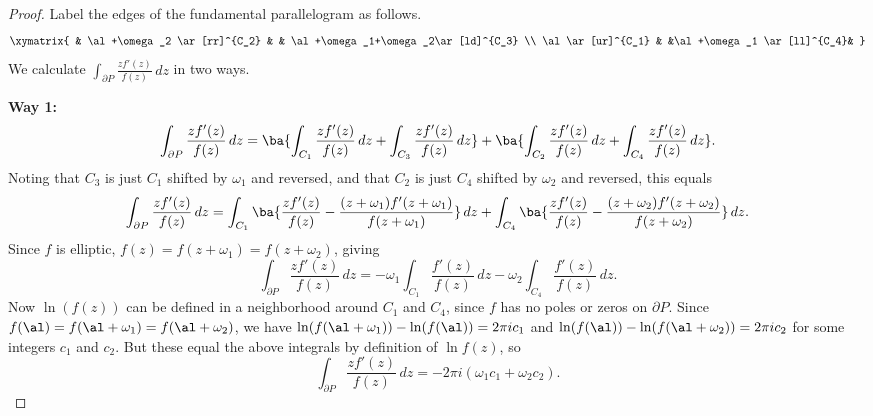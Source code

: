 \begin{proof}
Label the edges of the fundamental parallelogram as follows.
\[
\xymatrix{
& \al+\omega_2 \ar[rr]^{C_2} & & \al+\omega_1+\omega_2\ar[ld]^{C_3} \\
\al\ar[ur]^{C_1} & &\al+\omega_1 \ar[ll]^{C_4}&
}
\]
We calculate $\int_{\partial P} \frac{zf'(z)}{f(z)}\,dz$ in two ways.

\textbf{Way 1:} 
\[
\int_{\partial P} \frac{zf'(z)}{f(z)} \,dz=\ba{
\int_{C_1} \frac{zf'(z)}{f(z)}\,dz
+\int_{C_3} \frac{zf'(z)}{f(z)}\,dz
}
+\ba{
\int_{C_2} \frac{zf'(z)}{f(z)}\,dz
+\int_{C_4} \frac{zf'(z)}{f(z)}\,dz
}.
\]
Noting that $C_3$ is just $C_1$ shifted by $\omega_1$ and reversed, and that $C_2$ is just $C_4$ shifted by $\omega_2$ and reversed, this equals
\[
\int_{\partial P} \frac{zf'(z)}{f(z)} \,dz=
\int_{C_1} \ba{\frac{zf'(z)}{f(z)}
-\frac{(z+\omega_1)f'(z+\omega_1)}{f(z+\omega_1 )}
}\,dz
+
\int_{C_4} \ba{\frac{zf'(z)}{f(z)}- \frac{(z+\omega_2)f'(z+\omega_2)}{f(z+\omega_2)}
}\,dz.
\]
Since $f$ is elliptic, $f(z)=f(z+\omega_1)=f(z+\omega_2)$, giving
\[
\int_{\partial P} \frac{zf'(z)}{f(z)} \,dz=
-\omega_1\int_{C_1} \frac{f'(z)}{f(z)} \,dz-\omega_2\int_{C_4} \frac{f'(z)}{f(z)}\,dz.
\]
Now $\ln(f(z))$ can be defined in a neighborhood around $C_1$ and $C_4$, since $f$ has no poles or zeros on $\partial P$. Since $f(\al)=f(\al+\omega_1)=f(\al+\omega_2)$, we have $\ln(f(\al+\omega_1))-\ln(f(\al))=2\pi i c_1$ and $\ln(f(\al))-\ln(f(\al+\omega_2))=2\pi i c_2$ for some integers $c_1$ and $c_2$. But these equal the above integrals by definition of $\ln f(z)$, so
\begin{equation}\label{p1-1-1}
\int_{\partial P} \frac{zf'(z)}{f(z)} \,dz=
-2\pi i(\omega_1 c_1+\omega_2 c_2).
\end{equation}


\end{proof}
